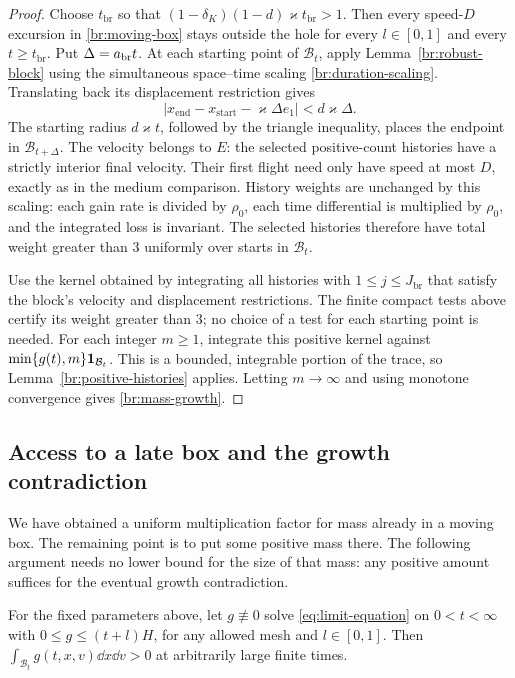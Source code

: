 \begin{proof}
Choose \(t_{\mathrm{br}}\) so that
\((1-\delta_K)(1-d)\varkappa t_{\mathrm{br}}>1\).
Then every speed-\(D\) excursion in
\eqref{br:moving-box} stays outside the hole for every
\(l\in[0,1]\) and every \(t\ge t_{\mathrm{br}}\).
Put \(\Delta=a_{\rm br}t\).
At each starting point of \(\mathcal B_t\), apply
Lemma~\ref{br:robust-block} using the simultaneous space--time scaling
\eqref{br:duration-scaling}. Translating back its displacement
restriction gives
\[
|x_{\mathrm{end}}-x_{\mathrm{start}}-\varkappa\Delta e_1|
<d\varkappa\Delta.
\]
The starting radius \(d\varkappa t\), followed by the triangle inequality,
places the endpoint in \(\mathcal B_{t+\Delta}\).
The velocity belongs to \(E\): the selected positive-count histories
have a strictly interior final velocity. Their first flight need
only have speed at most \(D\), exactly as in the medium comparison.
History weights are unchanged by this scaling: each gain rate is
divided by \(\rho_0\), each time differential is multiplied by
\(\rho_0\), and the integrated loss is invariant. The selected
histories therefore have total weight greater than 3 uniformly over
starts in \(\mathcal B_t\).

Use the kernel obtained by integrating all histories with
\(1\le j\le J_{\mathrm{br}}\) that satisfy the block's velocity and displacement
restrictions. The finite compact tests above certify its weight
greater than 3; no choice of a test for each starting point is needed.
For each integer \(m\ge1\), integrate this positive kernel against
\(\min\{g(t),m\}\mathbf 1_{\mathcal B_t}\). This is a bounded, integrable
portion of the trace, so Lemma~\ref{br:positive-histories} applies.
Letting \(m\to\infty\) and using monotone convergence gives
\eqref{br:mass-growth}.
\end{proof}

\subsection{Access to a late box and the growth contradiction}

We have obtained a uniform multiplication factor for mass already in a
moving box. The remaining point is to put some positive mass there.
The following argument needs no lower bound for the size of that mass:
any positive amount suffices for the eventual growth contradiction.

\begin{lemma}\label{br:accessibility}
For the fixed parameters above, let \(g\not\equiv0\) solve
\eqref{eq:limit-equation} on \(0<t<\infty\) with
\(0\le g\le(t+l)H\), for any allowed mesh and \(l\in[0,1]\).
Then \(\int_{\mathcal B_t}g(t,x,v)\dd x\dd v>0\) at arbitrarily large
finite times.
\end{lemma}

